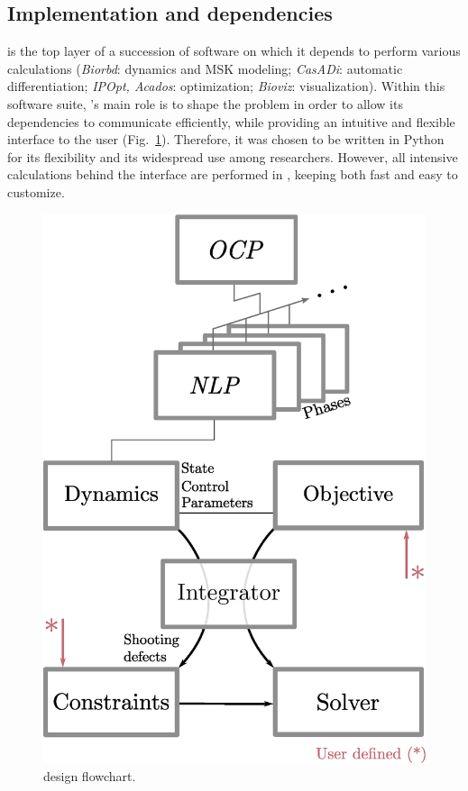 \subsection{Implementation and dependencies}
\bioptim is the top layer of a succession of software on which it depends to perform various calculations (\textit{Biorbd}: dynamics and MSK modeling; \textit{CasADi}: automatic differentiation; \textit{IPOpt, Acados}: optimization; \textit{Bioviz}: visualization).
Within this software suite, \bioptim 's main role is to shape the problem in order to allow its dependencies to communicate efficiently, while providing an intuitive and flexible interface to the user (Fig.~\ref{fig:dependencies}).
Therefore, it was chosen to be written in Python for its flexibility and its widespread use among researchers.
However, all intensive calculations behind the interface are performed in , keeping \bioptim both fast and easy to customize.

\begin{figure}[t!]
\centering
\includegraphics[width=0.9\columnwidth]{figures/design.eps}
\caption{\bioptim design flowchart.}
\label{fig:dependencies}
\vspace*{-0.5cm}
\end{figure}


